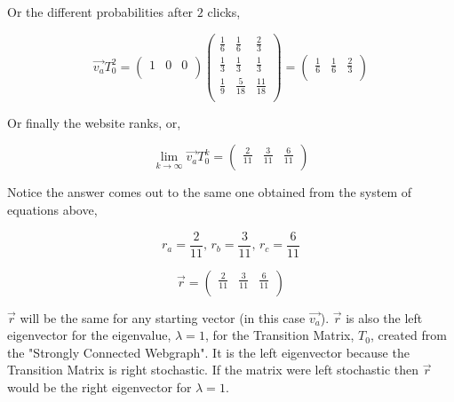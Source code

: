 \documentclass[12pt]{article}
\begin{document}
Or the different probabilities after $2$ clicks,

\[
\vec{v_a} T_0^2 =
\begin{pmatrix}
  1 & 0 & 0 \\
\end{pmatrix}
%
\begin{pmatrix}
  \frac{1}{6} & \frac{1}{6} & \frac{2}{3} \\
  \frac{1}{3} & \frac{1}{3} & \frac{1}{3}  \\
  \frac{1}{9} & \frac{5}{18} & \frac{11}{18} \\
\end{pmatrix}
%
=
%
\begin{pmatrix}
  \frac{1}{6} & \frac{1}{6} & \frac{2}{3} \\
\end{pmatrix}
\]


Or finally the website ranks, or,

\[
\lim_{k \to\infty} \vec{v_a} T_0^k =
%
\begin{pmatrix}
   \frac{2}{11} & \frac{3}{11} & \frac{6}{11} \\
\end{pmatrix}
\]

Notice the answer comes out to the same one obtained from the system of equations above,

\begin{equation}
	\nonumber r_a = \frac{2}{11}, \, r_b = \frac{3}{11}, \, r_c = \frac{6}{11}
\end{equation}

\[
\vec{r} =
%
\begin{pmatrix}
   \frac{2}{11} & \frac{3}{11} & \frac{6}{11} \\
\end{pmatrix}
\]

$\vec{r}$ will be the same for any starting vector (in this case $\vec{v_a}$). $\vec{r}$ is also the left eigenvector for the eigenvalue, $\lambda = 1$, for the Transition Matrix, $T_0$, created from the "Strongly Connected Webgraph". It is the left eigenvector because the Transition Matrix is right stochastic. If the matrix were left stochastic then $\vec{r}$ would be the right eigenvector for $\lambda = 1$.


%
%
\end{document}
